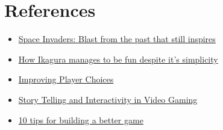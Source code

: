 \documentclass[a4paper]{scrreprt}
\begin{document}
\chapter{References}
  \begin{itemize}
    \item \href {https://www.bbc.com/news/technology-22714047}{Space Invaders: Blast from the past that still inspires}
    \item \href {https://gameoveragain.com/ikaruga-dreamcast/}{How Ikagura manages to be fun despite it's simplicity}
    \item \href {https://www.gamasutra.com/view/feature/130452/improving_player_choices.php}{Improving Player Choices}
    \item \href {https://the-artifice.com/video-gaming-story-telling-interactivity/}{Story Telling and Interactivity in Video Gaming}
    \item \href {https://www.creativebloq.com/inspiration/10-tips-building-better-game-5126304}{10 tips for building a better game}
  \end{itemize}
 

\end{document}
